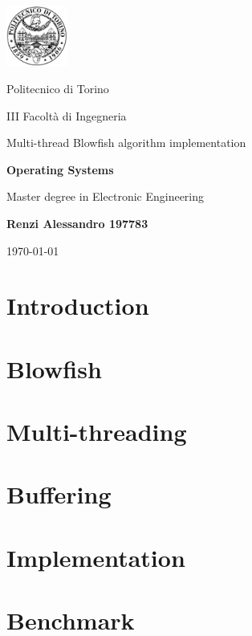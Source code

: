 \documentclass[12pt,  english, makeidx, a4paper, titlepage, oneside]{book}
\begin{document}
	\frontmatter
	\begin{titlepage}
		\vspace{2cm}
		\centerline{
		\includegraphics[width=2cm]{./Pictures/logopoli}}
		\smallskip
		\centerline{\LARGE Politecnico di Torino}
		\bigskip
		\centerline{\Large III Facolt\`a di Ingegneria}
		\vspace{4cm}
		\centerline{\Huge\sf Multi-thread Blowfish algorithm implementation}
		\bigskip
		\centerline{\Large\bfseries\sf Operating Systems}
		\vspace{3cm}
		\centerline{\Large Master degree in Electronic Engineering}
		\vspace{4.4cm}


%
\begin{center}
\textbf{	Renzi Alessandro 197783}
\end{center}						
%
		\vspace{1cm}
		\centerline{\small\today}
	\end{titlepage}

	\tableofcontents


	\mainmatter
	\lstset{language=C}



\chapter{Introduction} \label{introduction}



\chapter{Blowfish} \label{blowfish}


\chapter{Multi-threading} \label{multi-threading}


\chapter{Buffering} \label{buffering}


\chapter{Implementation} \label{implementation}


\chapter{Benchmark} \label{benchmark}

\end{document}
